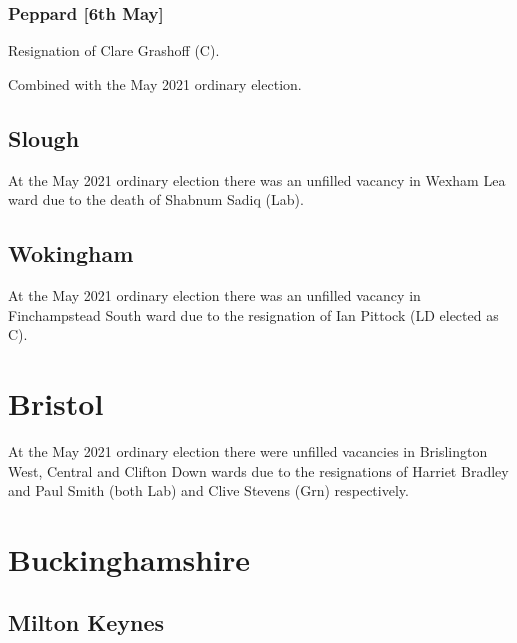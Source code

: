 \documentclass[a4paper,openany]{book}
\begin{document}
\begin{resultsiii}
\subsubsection*{Peppard \hspace*{\fill}\nolinebreak[1]%
	\enspace\hspace*{\fill}
	[6th May]}


Resignation of Clare Grashoff (C).

Combined with the May 2021 ordinary election.

\subsection*{Slough}

At the May 2021 ordinary election there was an unfilled vacancy in Wexham Lea ward due to the death of Shabnum Sadiq (Lab).

\subsection*{Wokingham}

At the May 2021 ordinary election there was an unfilled vacancy in Finchampstead South ward due to the resignation of Ian Pittock (LD elected as C).

\section{Bristol}

At the May 2021 ordinary election there were unfilled vacancies in Brislington West, Central and Clifton Down wards due to the resignations of Harriet Bradley and Paul Smith (both Lab) and Clive Stevens (Grn) respectively.

\section{Buckinghamshire}

\subsection*{Milton Keynes}


\end{resultsiii}
\end{document}
